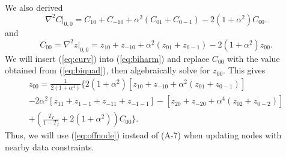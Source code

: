 \documentclass[12pt,letterpaper]{article}
\begin{document}
We also derived
\begin{equation}
\nabla^2 C \rvert _{0, 0} = C_{10} + C_{-10} + \alpha^2(C_{01} + C_{0-1}) - 2 (1+\alpha^2)C_{00}.
\label{eq:curv}
\end{equation}
and
\begin{equation}
C_{00} = \nabla^2 z \rvert _{0, 0} = z_{10} + z_{-10} + \alpha^2(z_{01} + z_{0-1}) - 2 (1+\alpha^2)z_{00}.
\end{equation}
We will insert (\ref{eq:curv}) into (\ref{eq:biharm}) and replace $C_{00}$ with the value obtained from (\ref{eq:biquad}), then algebraically solve for $z_{00}$.
This gives
\begin{equation}
\begin{split}
z_{00} = \frac{1}{2(1+\alpha^4)} \{ 2(1+\alpha^2) \left [ z_{10}+z_{-10}+\alpha^2(z_{01}+z_{0-1})\right ] \\
	-2\alpha^2\left [z_{11} + z_{1-1} + z_{-11} + z_{-1-1}\right ] - \left [z_{20} + z_{-20} + \alpha^4 (z_{02} + z_{0-2})\right ] \\
	+ \left (\frac{T_I}{1-T_I} + 2(1+\alpha^2)\right )C_{00} \}.
\label{eq:offnode}
\end{split}
\end{equation}
Thus, we will use (\ref{eq:offnode}) instead of (A-7) when updating nodes with nearby data constraints.
\end{document}
